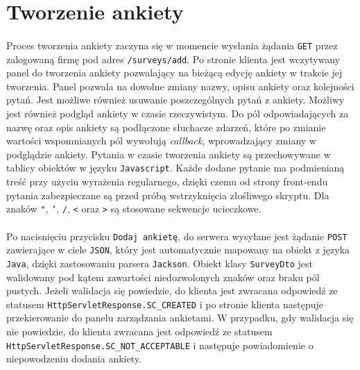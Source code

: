 \section{Tworzenie ankiety}
\paragraph{}
Proces tworzenia ankiety zaczyna się w momencie wysłania żądania \texttt{GET} przez zalogowaną firmę pod adres \texttt{/surveys/add}. Po stronie klienta jest wczytywany panel do tworzenia ankiety pozwalający na bieżącą edycję ankiety w trakcie jej tworzenia. Panel pozwala na dowolne zmiany nazwy, opisu ankiety oraz kolejności pytań. Jest możliwe również usuwanie poszczególnych pytań z ankiety. Możliwy jest również podgląd ankiety w czasie rzeczywistym. Do pól odpowiadających za nazwę oraz opis ankiety są podłączone słuchacze zdarzeń, które po zmianie wartości wspomnianych pól wywołują \textit{callback}, wprowadzający zmiany w podglądzie ankiety. Pytania w czasie tworzenia ankiety są przechowywane w tablicy obiektów w języku \texttt{Javascript}. Każde dodane pytanie ma podmienianą treść przy użyciu wyrażenia regularnego, dzięki czemu od strony front-endu pytania zabezpieczane są przed próbą wstrzyknięcia złośliwego skryptu. Dla znaków \texttt{"}, \texttt{'}, \texttt{/}, \texttt{<} oraz \texttt{>} są stosowane sekwencje ucieczkowe.

\paragraph{}
Po nacisnięciu przycisku \texttt{Dodaj ankietę}, do serwera wysyłane jest żądanie \texttt{POST} zawierające w ciele \texttt{JSON}, który jest automatycznie mapowany na obiekt z języka \texttt{Java}, dzięki zastosowaniu parsera \texttt{Jackson}. Obiekt klasy \texttt{SurveyDto} jest walidowany pod kątem zawartości niedozwolonych znaków oraz braku pól pustych. Jeżeli walidacja się powiedzie, do klienta jest zwracana odpowiedź ze statusem \texttt{HttpServlet\linebreak Response.SC\_CREATED} i po stronie klienta następuje przekierowanie do panelu zarządzania ankietami. W przypadku, gdy walidacja się nie powiedzie, do klienta zwracana jest odpowiedź ze statusem \texttt{HttpServlet\linebreak Response.SC\_NOT\_ACCEPTABLE} i następuje powiadomienie o niepowodzeniu dodania ankiety.


